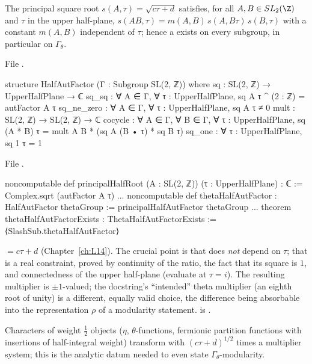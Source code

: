 \begin{theorem}\label{l17:thm:halfaut}
The principal square root $s(A,\tau)=\sqrt{c\tau+d}$ satisfies, for all $A,B\in SL_2(\Z)$ and $\tau$ in
the upper half-plane, $s(AB,\tau)=m(A,B)\,s(A,B\tau)\,s(B,\tau)$ with a constant $m(A,B)$ independent
of $\tau$; hence a  exists on every subgroup, in particular on $\Gamma_\theta$.
\end{theorem}
\noindent File .
\begin{leancode}
structure HalfAutFactor (Γ : Subgroup SL(2, ℤ)) where
  sq : SL(2, ℤ) → UpperHalfPlane → ℂ
  sq_sq : ∀ A ∈ Γ, ∀ τ : UpperHalfPlane, sq A τ ^ (2 : ℤ) = autFactor A τ
  sq_ne_zero : ∀ A ∈ Γ, ∀ τ : UpperHalfPlane, sq A τ ≠ 0
  mult : SL(2, ℤ) → SL(2, ℤ) → ℂ
  cocycle : ∀ A ∈ Γ, ∀ B ∈ Γ, ∀ τ : UpperHalfPlane,
    sq (A * B) τ = mult A B * (sq A (B • τ) * sq B τ)
  sq_one : ∀ τ : UpperHalfPlane, sq 1 τ = 1
\end{leancode}
\noindent File .
\begin{leancode}
noncomputable def principalHalfRoot (A : SL(2, ℤ)) (τ : UpperHalfPlane) : ℂ :=
  Complex.sqrt (autFactor A τ)
...
noncomputable def thetaHalfAutFactor : HalfAutFactor thetaGroup :=
  principalHalfAutFactor thetaGroup
...
theorem thetaHalfAutFactorExists : ThetaHalfAutFactorExists :=
  ⟨SlashSub.thetaHalfAutFactor⟩
\end{leancode}
\begin{dictionary}
 $=c\tau+d$ (Chapter~\ref{ch:L14}). The crucial point is that  does
\emph{not} depend on $\tau$; that is a real constraint, proved by continuity of the ratio, the fact that
its square is $1$, and connectedness of the upper half-plane (evaluate at $\tau=i$). The resulting
multiplier is $\pm1$-valued; the docstring's ``intended'' theta multiplier (an eighth root of unity) is
a different, equally valid choice, the difference being absorbable into the representation $\rho$ of a
modularity statement.  is
.
\end{dictionary}
\begin{physics}
Characters of weight $\frac12$ objects ($\eta$, $\theta$-functions, fermionic partition functions with
insertions of half-integral weight) transform with $(c\tau+d)^{1/2}$ times a multiplier system; this is
the analytic datum needed to even state $\Gamma_\theta$-modularity.
\end{physics}
